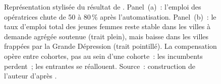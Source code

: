 \begin{figure}[htbp]
\caption[Automatisation de la commutation téléphonique~: displacement et reinstatement]{Représentation stylisée du résultat de \textcite{feigenbaum_answering_2024}. Panel~(a)~: l'emploi des opératrices chute de 50 à 80\,\% après l'automatisation. Panel~(b)~: le taux d'emploi total des jeunes femmes reste stable dans les villes à demande agrégée soutenue (trait plein), mais baisse dans les villes frappées par la Grande Dépression (trait pointillé). La compensation opère entre cohortes, pas au sein d'une cohorte~: les incumbents perdent~; les entrantes se réallouent. Source~: construction de l'auteur d'après \textcite{feigenbaum_answering_2024}.}
\label{fig:feigenbaum-stylized}
\end{figure}
